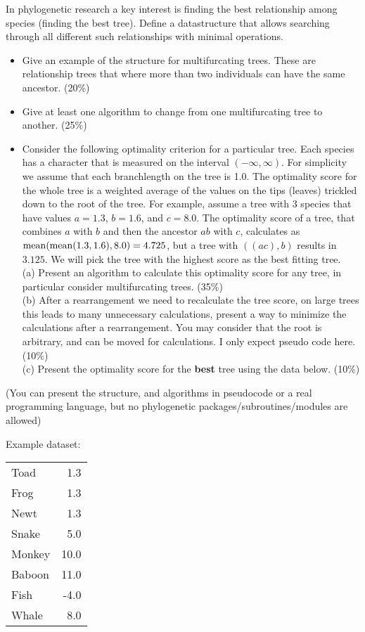 \documentclass [11point]{article}
\begin{document}
In phylogenetic research a key interest is finding the best relationship among species (finding the best tree). Define a datastructure that allows searching through all different such relationships with minimal operations. 
\begin{itemize}
\item Give an example of the structure for multifurcating trees. These are relationship trees that where more than two individuals can have the same ancestor. (20\%)
\item Give at least one algorithm to change from one multifurcating tree to another. (25\%)
\item Consider the following optimality criterion for a particular tree. Each species has a character that is measured on the interval $(-\infty, \infty)$.
For simplicity we assume that each branchlength on the tree is 1.0. The optimality score for the whole tree is a weighted average of the values on the tips (leaves) trickled down to the root of the tree. For example, assume a tree with 3 species that have values $a=1.3$, $b=1.6$, and $c=8.0$. The optimality score of a tree, that combines $a$ with $b$ and then the ancestor $ab$ with $c$, calculates as ${\rm mean}({\rm mean}(1.3,1.6),8.0)=4.725$, but a tree with $((ac),b)$ results in $3.125$. We will pick the tree with the highest score as the best fitting tree.\\
(a) Present an algorithm to calculate this optimality score for any tree, in particular consider multifurcating trees. (35\%)\\
(b) After a rearrangement we need to recalculate the tree score, on large trees this leads to many unnecessary calculations, present a way to minimize the calculations after a rearrangement. You may consider that the root is arbitrary, and can be moved for calculations. I only expect pseudo code here. (10\%)\\
(c) Present the optimality score for the {\bf best} tree using the data below. (10\%)
\end{itemize}
(You can present the structure, and algorithms in pseudocode or a real programming language, but no phylogenetic packages/subroutines/modules are allowed)

Example dataset:\\
\begin{tabular}{l r}
Toad & 1.3\\
Frog  & 1.3\\
Newt & 1.3\\
Snake & 5.0\\
Monkey & 10.0\\
Baboon & 11.0\\
Fish & -4.0\\
Whale & 8.0
\end{tabular}
\end{document}
